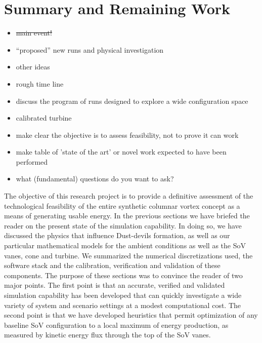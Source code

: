 \section{Summary and Remaining Work}
\label{sec:future_work}

\begin{itemize}
\item \st{main event!}
\item ``proposed'' new runs and physical investigation
\item other ideas
\item rough time line
\item discuss the program of runs designed to explore a wide configuration space
\item calibrated turbine
\item make clear the objective is to assess feasibility, not to prove it can work
\item make table of 'state of the art' or novel work expected to have been performed
\item what (fundamental) questions do you want to ask?
\end{itemize}

The objective of this research project is to provide a definitive assessment of the 
technological feasibility of the entire synthetic columnar vortex concept as a 
means of generating usable energy. In the 
previous sections we have briefed the reader on the present state of the simulation capability. 
In doing so, we have discussed the physics that influence 
Dust-devils formation, as well as our particular mathematical models for the ambient conditions 
as well as the SoV vanes, cone and turbine. We summarized the numerical discretizations used, the software stack 
and the calibration, verification and validation of these components. 
The purpose of these sections was to convince the reader of two major points. 
The first point is that an accurate, verified and validated simulation capability has been developed
that can quickly investigate a wide variety of system and scenario settings 
at a modest computational cost. 
The second point is that we have developed heuristics that permit optimization of any baseline SoV
configuration to a local maximum of energy production, as measured by kinetic energy flux 
through the top of the SoV vanes. 

